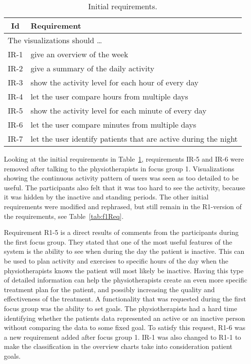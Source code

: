 \begin{table}[h!]
  \begin{center}
  \begin{tabular}{|c|p{12cm}|}
    \hline
      \textbf{Id} & \textbf{Requirement} \\ \hline
    \multicolumn{2}{|l|}{The visualizations should \ldots} \\ \hline
      IR-1 & give an overview of the week \\ \hline
      IR-2 & give a summary of the daily activity \\ \hline
      IR-3 & show the activity level for each hour of every day \\ \hline
      IR-4 & let the user compare hours from multiple days \\ \hline
      IR-5 & show the activity level for each minute of every day \\ \hline
      IR-6 & let the user compare minutes from multiple days \\ \hline
      IR-7 & let the user identify patients that are active during the night \\ \hline
  \end{tabular}
  \end{center}
  \caption{Initial requirements.}
  \label{tab:initReq}
\end{table}

Looking at the initial requirements in Table~\ref{tab:initReq}, requirements IR-5 and IR-6 were removed after talking to the physiotherapists in focus group 1. Visualizations showing the continuous activity pattern of users was seen as too detailed to be useful. The participants also felt that it was too hard to see the activity, because it was hidden by the inactive and standing periods. The other initial requirements were modified and rephrased, but still remain in the R1-version of the requirements, see Table~\ref{tab:f1Req}. 

Requirement R1-5 is a direct results of comments from the participants during the first focus group. They stated that one of the most useful features of the system is the ability to see when during the day the patient is inactive. This can be used to plan activity and exercises to specific hours of the day when the physiotherapists knows the patient will most likely be inactive. Having this type of detailed information can help the physiotherapists create an even more specific treatment plan for the patient, and possibly increasing the quality and effectiveness of the treatment. A functionality that was requested during the first focus group was the ability to set goals. The physiotherapists had a hard time identifying whether the patients data represented an active or an inactive person without comparing the data to some fixed goal. To satisfy this request, R1-6 was a new requirement added after focus group 1. IR-1 was also changed to R1-1 to make the classification in the overview charts take into consideration patient goals.

